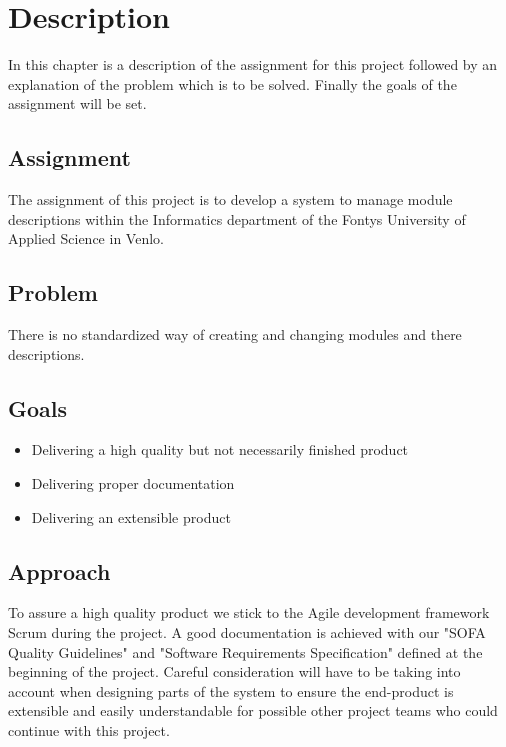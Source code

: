 \chapter{Description}
In this chapter is a description of the assignment for this project followed by an explanation 
of the problem which is to be solved. Finally the goals of the assignment will be set.

\section{Assignment}
The assignment of this project is to develop a system to manage module descriptions within the Informatics
department of the Fontys University of Applied Science in Venlo. 

\section{Problem}
There is no standardized way of creating and changing modules and there descriptions. 

\section{Goals}
\begin{itemize}
    \item Delivering a high quality but not necessarily finished product 
    \item Delivering proper documentation
    \item Delivering an extensible product
\end{itemize}

\newpage

\section{Approach}
To assure a high quality product we stick to the Agile development framework Scrum during the project.
A good documentation is achieved with our "SOFA Quality Guidelines" and "Software Requirements Specification" defined at the beginning of the project.
Careful consideration will have to be taking into account when designing parts of the system to ensure the end-product is extensible and easily understandable for possible other project teams who could continue with this project.


